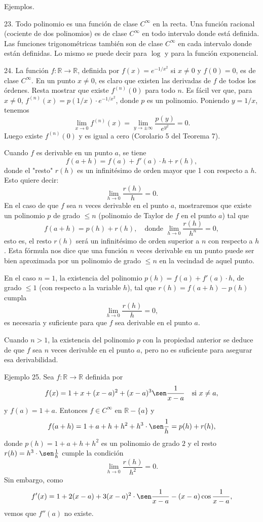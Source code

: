 \documentclass[12pt,oneside]{book}
\begin{document}
Ejemplos.

23. Todo polinomio es una función de clase \( C^\infty \) en la recta. Una función racional (cociente de dos polinomios) es de clase \( C^\infty \) en todo intervalo donde está definida. Las funciones trigonométricas también son de clase \( C^\infty \) en cada intervalo donde están definidas. Lo mismo se puede decir para \( \log \) y para la función exponencial.

24. La función \( f: \mathbb{R} \to \mathbb{R} \), definida por \( f(x) = e^{-1/x^2} \) si \( x \neq 0 \) y \( f(0) = 0 \), es de clase \( C^\infty \). En un punto \( x \neq 0 \), es claro que existen las derivadas de \( f \) de todos los órdenes. Resta mostrar que existe \( f^{(n)}(0) \) para todo \( n \). Es fácil ver que, para \( x \neq 0 \), \( f^{(n)}(x) = p(1/x) \cdot e^{-1/x^2} \), donde \( p \) es un polinomio. Poniendo \( y = 1/x \), tenemos
\[
\lim_{x \to 0} f^{(n)}(x) = \lim_{y \to \pm \infty} \frac{p(y)}{e^{y^2}} = 0.
\]
Luego existe \( f^{(n)}(0) \) y es igual a cero (Corolario 5 del Teorema 7).

Cuando \( f \) es derivable en un punto \( a \), se tiene
\[
f(a + h) = f(a) + f'(a) \cdot h + r(h),
\]
donde el "resto" \( r(h) \) es un infinitésimo de orden mayor que 1 con respecto a \( h \). Esto quiere decir:
\[
\lim_{h \to 0} \frac{r(h)}{h} = 0.
\]
En el caso de que \( f \) sea \( n \) veces derivable en el punto \( a \), mostraremos que existe un polinomio \( p \) de grado \( \leq n \) (polinomio de Taylor de \( f \) en el punto \( a \)) tal que
\[
f(a + h) = p(h) + r(h), \quad \text{donde } \lim_{h \to 0} \frac{r(h)}{h^n} = 0,
\]
esto es, el resto \( r(h) \) será un infinitésimo de orden superior a \( n \) con respecto a \( h \). Esta fórmula nos dice que una función \( n \) veces derivable en un punto puede ser bien aproximada por un polinomio de grado \( \leq n \) en la vecindad de aquel punto.

En el caso \( n = 1 \), la existencia del polinomio \( p(h) = f(a) + f'(a) \cdot h \), de grado \( \leq 1 \) (con respecto a la variable \( h \)), tal que \( r(h) = f(a+h) - p(h) \) cumpla
\[
\lim_{h \to 0} \frac{r(h)}{h} = 0,
\]
es necesaria y suficiente para que \( f \) sea derivable en el punto \( a \).

Cuando \( n > 1 \), la existencia del polinomio \( p \) con la propiedad anterior se deduce de que \( f \) sea \( n \) veces derivable en el punto \( a \), pero no es suficiente para asegurar esa derivabilidad.

Ejemplo 25. Sea \( f: \mathbb{R} \to \mathbb{R} \) definida por
\[
f(x) = 1 + x + (x-a)^2 + (x-a)^3 \sen \frac{1}{x-a} \quad \text{si } x \neq a,
\]
y \( f(a) = 1 + a \). Entonces \( f \in C^\infty \) en \( \mathbb{R} - \{a\} \) y
\[
f(a + h) = 1 + a + h + h^2 + h^3 \cdot \sen \frac{1}{h}
= p(h) + r(h),
\]
donde \( p(h) = 1 + a + h + h^2 \) es un polinomio de grado \( 2 \) y el resto \( r(h) = h^3 \cdot \sen \frac{1}{h} \) cumple la condición
\[
\lim_{h \to 0} \frac{r(h)}{h^2} = 0.
\]
Sin embargo, como
\[
f'(x) = 1 + 2(x-a) + 3(x-a)^2 \cdot \sen \frac{1}{x-a} - (x-a) \cos \frac{1}{x-a},
\]
vemos que \( f''(a) \) no existe.
\end{document}
